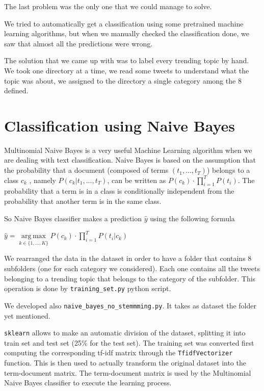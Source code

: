 \documentclass[journal,11pt]{vgtc}
\DeclareMathOperator*{\argmax}{arg\,max}
\begin{document}
The last problem was the only one that we could manage to solve. 

We tried to automatically get a classification using some pretrained machine learning algorithms, but when we 
manually checked the classification done, we saw that almost all the predictions were wrong.

The solution that we came up with was to label every trending topic by hand. 
We took one directory at a time, we read some tweets to understand what the topic was about, 
we assigned to the directory a single category among the 8 defined.

\section{Classification using Naive Bayes}
Multinomial Naive Bayes is a very useful Machine Learning algorithm when we are dealing with
text classification. 
Naive Bayes is based on the assumption that the probability that a document (composed of terms $(t_1,...,t_T)$) belongs to a class $c_k$
, namely $P(c_k | t_1, ..., t_T) $, can be written as $P(c_k) \cdot \prod\limits_{i=1}^{T}P(t_i)$.
The probability that a term is in a class is conditionally independent from the probability that 
 another term is in the same class.

 So Naive Bayes classifier makes a prediction $\hat{y}$ using the following formula

\begin{center}
$\hat{y} = \argmax\limits_{k \in \{1, ..., K \}} P(c_k) \cdot \prod\limits_{i = 1}^{T} P(t_i | c_k)$
\end{center}

We rearranged the data in the dataset in order to have a folder that contains 8 subfolders (one for each
category we considered). Each one contains all the tweets belonging to a trending topic that belongs to the category of the subfolder.
This operation is done by \texttt{training\_set.py} python script.

We developed also \texttt{naive\_bayes\_no\_stemmming.py}. It takes as dataset the folder yet mentioned.

\texttt{sklearn} allows to make an automatic division of the dataset, splitting it into train set and
test set (25\% for the test set).
The training set was converted first computing the corresponding tf-idf matrix through the \texttt{TfidfVectorizer} function. 
This is then used to actually transform the original dataset into the term-document matrix.
The term-document matrix is used by the Multinomial Naive Bayes classifier to execute the learning process.
\end{document}
